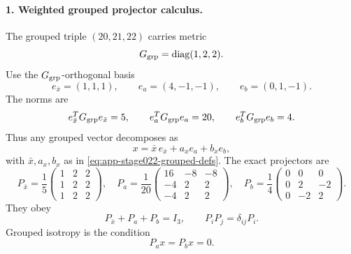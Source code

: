 \paragraph{1. Weighted grouped projector calculus.}
The grouped triple \((20,21,22)\) carries metric
\begin{equation}
\label{eq:app-stage023-grouped-metric}
G_{\rm grp}=\operatorname{diag}(1,2,2).
\end{equation}
Use the \(G_{\rm grp}\)-orthogonal basis
\begin{equation}
\label{eq:app-stage023-basis}
e_{\bar x}=(1,1,1),
\qquad
e_a=(4,-1,-1),
\qquad
e_b=(0,1,-1).
\end{equation}
The norms are
\begin{equation}
\label{eq:app-stage023-norms}
e_{\bar x}^TG_{\rm grp}e_{\bar x}=5,
\qquad
e_a^TG_{\rm grp}e_a=20,
\qquad
e_b^TG_{\rm grp}e_b=4.
\end{equation}
Thus any grouped vector decomposes as
\begin{equation}
\label{eq:app-stage023-decomp}
x=\bar x\,e_{\bar x}+a_xe_a+b_xe_b,
\end{equation}
with \(\bar x,a_x,b_x\) as in \eqref{eq:app-stage022-grouped-defs}.  The exact projectors are
\begin{equation}
\label{eq:app-stage023-projectors}
\boxed{
P_{\bar x}=\frac15
\begin{pmatrix}
1&2&2\\1&2&2\\1&2&2
\end{pmatrix},
\quad
P_a=\frac1{20}
\begin{pmatrix}
16&-8&-8\\-4&2&2\\-4&2&2
\end{pmatrix},
\quad
P_b=\frac14
\begin{pmatrix}
0&0&0\\0&2&-2\\0&-2&2
\end{pmatrix}}.
\end{equation}
They obey
\begin{equation}
\label{eq:app-stage023-projector-identities}
P_{\bar x}+P_a+P_b=I_3,
\qquad
P_iP_j=\delta_{ij}P_i.
\end{equation}
Grouped isotropy is the condition
\begin{equation}
\label{eq:app-stage023-isotropy-projector}
P_ax=P_bx=0.
\end{equation}

